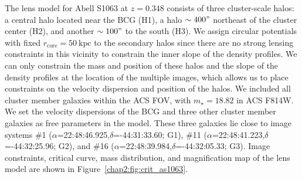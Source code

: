 The lens model for Abell S1063 at $z=0.348$ consists of three cluster-scale halos: a central halo located near the BCG (H1), a halo $\sim400"$ northeast of the cluster center (H2), and another $\sim100"$ to the south (H3). We assign circular potentials with fixed $r_\mathrm{core}=50\ \mathrm{kpc}$ to the secondary halos since there are no strong lensing constraints in this vicinity to constrain the inner slope of the density profiles. We can only constrain the mass and position of these halos and the slope of the density profiles at the location of the multiple images, which allows us to place constraints on the velocity dispersion and position of the halos. We included all cluster member galaxies within the ACS FOV, with $m_\star=18.82$ in ACS F814W. We set the velocity dispersions of the BCG and three other cluster member galaxies as free parameters in the model. These three galaxies lie close to image systems \#1 ($\alpha$=22:48:46.925,$\delta$=-44:31:33.60; G1), \#11 ($\alpha$=22:48:41.223,$\delta$=-44:32:25.96; G2), and \#16 ($\alpha$=22:48:39.984,$\delta$=-44:32:05.33; G3). Image constraints, critical curve, mass distribution, and magnification map of the lens model are shown in Figure~\ref{chap2:fig:crit_as1063}.

